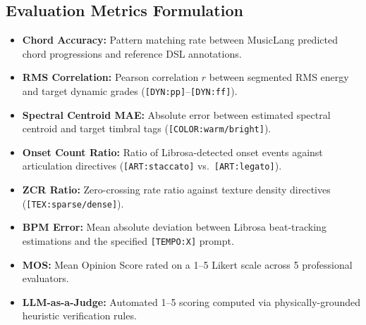 \documentclass[conference]{IEEEtran}
\begin{document}
\subsection{Evaluation Metrics Formulation}
\begin{itemize}[leftmargin=*]
    \item \textbf{Chord Accuracy:} Pattern matching rate between MusicLang predicted chord progressions and reference DSL annotations.
    \item \textbf{RMS Correlation:} Pearson correlation $r$ between segmented RMS energy and target dynamic grades (\texttt{[DYN:pp]}--\texttt{[DYN:ff]}).
    \item \textbf{Spectral Centroid MAE:} Absolute error between estimated spectral centroid and target timbral tags (\texttt{[COLOR:warm/bright]}).
    \item \textbf{Onset Count Ratio:} Ratio of Librosa-detected onset events against articulation directives (\texttt{[ART:staccato]} vs.\ \texttt{[ART:legato]}).
    \item \textbf{ZCR Ratio:} Zero-crossing rate ratio against texture density directives (\texttt{[TEX:sparse/dense]}).
    \item \textbf{BPM Error:} Mean absolute deviation between Librosa beat-tracking estimations and the specified \texttt{[TEMPO:X]} prompt.
    \item \textbf{MOS:} Mean Opinion Score rated on a 1--5 Likert scale across 5 professional evaluators.
    \item \textbf{LLM-as-a-Judge:} Automated 1--5 scoring computed via physically-grounded heuristic verification rules.
\end{itemize}



\balance
\end{document}
